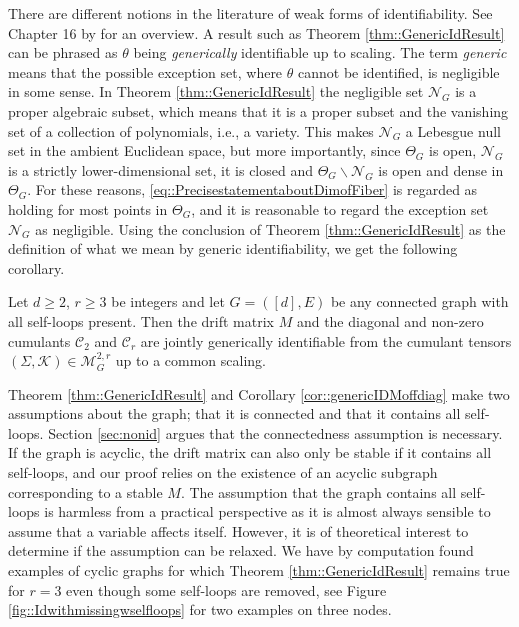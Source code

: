 \documentclass{biometrika}
\begin{document}
There are different notions in the literature of weak forms of identifiability.
See Chapter 16 by \cite{sullivant2018algebraic} for an overview.
A result such as Theorem \ref{thm::GenericIdResult} can be    
phrased as $\theta$ being \emph{generically} identifiable up to scaling. The 
term \emph{generic} means that the possible exception set, where $\theta$
cannot be identified, is negligible in some sense. In Theorem 
\ref{thm::GenericIdResult} the negligible set $\mathcal{N}_G$ is a proper 
algebraic subset, which means that it is a proper subset and the 
vanishing set of a collection of polynomials, i.e., a variety. This makes $\mathcal{N}_G$ a Lebesgue 
null set in the ambient Euclidean space, but more importantly,
since $\Theta_G$ is open, $\mathcal{N}_G$ is a strictly lower-dimensional 
set, it is closed and $\Theta_G \backslash \mathcal{N}_G$ is open and 
dense in $\Theta_G$. For these reasons, \eqref{eq::PrecisestatementaboutDimofFiber}
is regarded as holding for most points in $\Theta_G$, and it is reasonable 
to regard the exception set 
$\mathcal{N}_G$ as negligible. Using the conclusion of 
Theorem \ref{thm::GenericIdResult} as the definition of what we mean by generic 
identifiability, we get the following corollary.

\begin{corollary}
    \label{cor::genericIDMoffdiag}
    Let $d \geq 2$, $r \geq 3$ be integers and let $G = ([d], E)$ be any connected graph with all self-loops present. Then the drift matrix $M$ and the diagonal and non-zero cumulants $\mathcal{C}_2$ and $\mathcal{C}_r$ are jointly generically identifiable from 
    the cumulant tensors $(\Sigma, \mathcal{K} ) \in \mathcal{M}^{2,r}_G$ up to a common scaling. 
\end{corollary}

\begin{remark} \label{rem::Selfloops}
    Theorem \ref{thm::GenericIdResult} and Corollary \ref{cor::genericIDMoffdiag} make two assumptions about the graph; that it is connected and that it contains all self-loops. Section \ref{sec:nonid}
    argues that the connectedness assumption is necessary. If the graph is acyclic, the drift matrix 
    can also only be stable if it contains all self-loops, and our proof relies on the existence of 
    an acyclic subgraph corresponding to a stable $M$. The assumption that the graph contains 
    all self-loops is harmless from a practical perspective as it is almost always 
    sensible to assume that a variable affects itself. However, it is of theoretical 
    interest to determine if the assumption can be relaxed. We have by computation found 
    examples of cyclic graphs for which Theorem \ref{thm::GenericIdResult} remains true for 
    $r = 3$ even though some self-loops are removed, see Figure \ref{fig::Idwithmissingwselfloops} for two examples on three nodes. 
\end{remark} 
\end{document}
